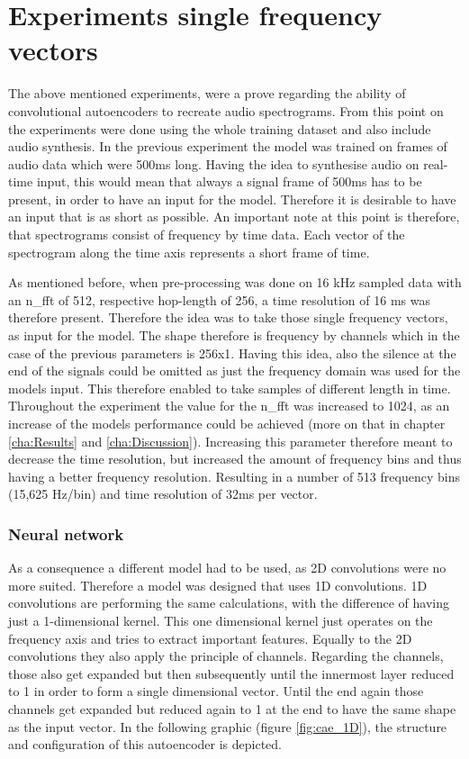 \section{Experiments single frequency vectors}
The above mentioned experiments, were a prove regarding the ability of convolutional autoencoders to recreate audio spectrograms. From this point on the experiments were done using the whole training dataset and also include audio synthesis. In the previous experiment the model was trained on frames of audio data which were 500ms long. Having the idea to synthesise audio on real-time input, this would mean that always a signal frame of 500ms has to be present, in order to have an input for the model. Therefore it is desirable to have an input that is as short as possible. An important note at this point is therefore, that spectrograms consist of frequency by time data. Each vector of the spectrogram along the time axis represents a short frame of time. 

As mentioned before, when pre-processing was done on 16 kHz sampled data with an n\_fft of 512, respective hop-length of 256, a time resolution of 16 ms was therefore present. Therefore the idea was to take those single frequency vectors, as input for the model. The shape therefore is frequency by channels which in the case of the previous parameters is 256x1. Having this idea, also the silence at the end of the signals could be omitted as just the frequency domain was used for the models input. This therefore enabled to take samples of different length in time. Throughout the experiment the value for the n\_fft was increased to 1024, as an increase of the models performance could be achieved (more on that in chapter \ref{cha:Results} and \ref{cha:Discussion}). Increasing this parameter therefore meant to decrease the time resolution, but increased the amount of frequency bins and thus having a better frequency resolution. Resulting in a number of 513 frequency bins (15,625 Hz/bin) and time resolution of 32ms per vector.


\subsubsection{Neural network}
As a consequence a different model had to be used, as 2D convolutions were no more suited. Therefore a model was designed that uses 1D convolutions. 1D convolutions are performing the same calculations, with the difference of having just a 1-dimensional kernel. This one dimensional kernel just operates on the frequency axis and tries to extract important features. Equally to the 2D convolutions they also apply the principle of channels. Regarding the channels, those also get expanded but then subsequently until the innermost layer reduced to 1 in order to form a single dimensional vector. Until the end again those channels get expanded but reduced again to 1 at the end to have the same shape as the input vector. In the following graphic (figure \ref{fig:cae_1D}), the structure and configuration of this autoencoder is depicted. 


